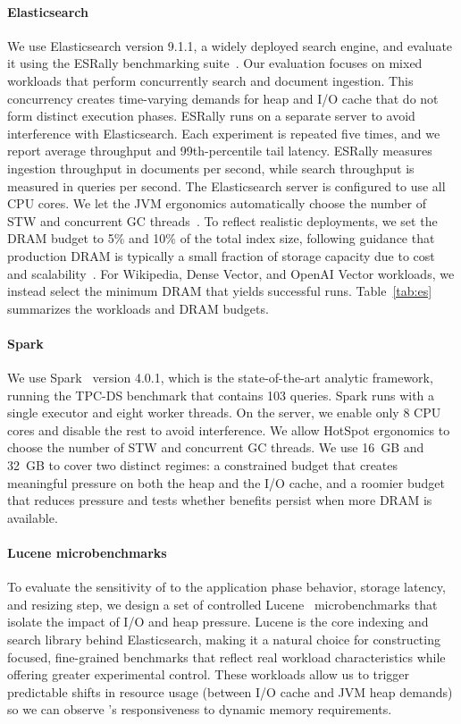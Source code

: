 \paragraph{\textbf{Elasticsearch}}
We use Elasticsearch version 9.1.1, a widely deployed search engine, and evaluate it using the ESRally benchmarking suite~\cite{esrally}.
%
Our evaluation focuses on mixed workloads that perform concurrently search and document ingestion.
This concurrency creates time-varying demands for heap and I/O cache that do not form distinct execution phases.
%
ESRally runs on a separate server to avoid interference with Elasticsearch.
Each experiment is repeated five times, and we report average throughput and 99th-percentile tail latency.
%
ESRally measures ingestion throughput in documents per second, while search throughput is measured in queries per second.
%
The Elasticsearch server is configured to use all CPU cores.
We let the JVM ergonomics automatically choose the number of STW and concurrent GC threads~\cite{g1:guidelines}.
To reflect realistic deployments, we set the DRAM budget to 5\% and 10\% of the total index size, following guidance that production DRAM is typically a small fraction of storage capacity due to cost and scalability~\cite{elasticcloud}.
For Wikipedia, Dense Vector, and OpenAI Vector workloads, we instead select the minimum DRAM that yields successful runs.
Table~\ref{tab:es} summarizes the workloads and DRAM budgets.

\paragraph{\textbf{Spark}}
We use Spark~\cite{zaharia:spark} version 4.0.1, which is the state-of-the-art analytic framework, running the TPC-DS benchmark that contains 103 queries.
Spark runs with a single executor and eight worker threads.
On the server, we enable only 8 CPU cores and disable the rest to avoid interference.
We allow HotSpot ergonomics to choose the number of STW and concurrent GC threads.
We use \SI{16}{GB} and \SI{32}{GB} to cover two distinct regimes: a constrained budget that creates meaningful pressure on both the heap and the I/O cache, and a roomier budget that reduces pressure and tests whether benefits persist when more DRAM is available.

\paragraph{\textbf{Lucene microbenchmarks}}
To evaluate the sensitivity of \flexheapName{} to the application phase behavior, storage latency, and resizing step, we design a set of controlled Lucene~\cite{mccandless:lucene} microbenchmarks that isolate the impact of I/O and heap pressure.
Lucene is the core indexing and search library behind Elasticsearch, making it a natural choice for constructing focused, fine-grained benchmarks that reflect real workload characteristics while offering greater experimental control.
These workloads allow us to trigger predictable shifts in resource usage (between I/O cache and JVM heap demands) so we can observe \flexheapName{}’s responsiveness to dynamic memory requirements.

